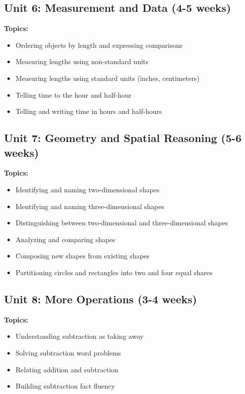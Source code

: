 \documentclass[11pt,letterpaper]{report}
\begin{document}
\subsection{Unit 6: Measurement and Data (4-5 weeks)}

\textbf{Topics:}
\begin{itemize}
    \item Ordering objects by length and expressing comparisons
    \item Measuring lengths using non-standard units
    \item Measuring lengths using standard units (inches, centimeters)
    \item Telling time to the hour and half-hour
    \item Telling and writing time in hours and half-hours
\end{itemize}

\subsection{Unit 7: Geometry and Spatial Reasoning (5-6 weeks)}

\textbf{Topics:}
\begin{itemize}
    \item Identifying and naming two-dimensional shapes
    \item Identifying and naming three-dimensional shapes
    \item Distinguishing between two-dimensional and three-dimensional shapes
    \item Analyzing and comparing shapes
    \item Composing new shapes from existing shapes
    \item Partitioning circles and rectangles into two and four equal shares
\end{itemize}

\subsection{Unit 8: More Operations (3-4 weeks)}

\textbf{Topics:}
\begin{itemize}
    \item Understanding subtraction as taking away
    \item Solving subtraction word problems
    \item Relating addition and subtraction
    \item Building subtraction fact fluency
\end{itemize}
\end{document}
